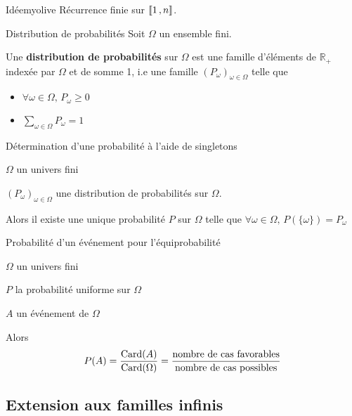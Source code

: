     \begin{demo}{Idée}{myolive}
        Récurrence finie sur $\left\llbracket 1 \, , n \right\rrbracket$.
    \end{demo}

    \begin{defi}{Distribution de probabilités}{}
        Soit $\Omega$ un ensemble fini.

        Une \textbf{distribution de probabilités} sur $\Omega$ est une famille d’éléments de $\mathbb{R}_+$ indexée par $\Omega$ et de somme 1, i.e une famille $(P_{\omega})_{\omega \in \Omega}$ telle que 
        \begin{itemize}
            \item $\forall \omega \in \Omega, \, P_{\omega} \geq 0$
            \item $\sum\limits_{\omega \in \Omega} P_{\omega} = 1$
        \end{itemize}
    \end{defi}

    \begin{theo}{Détermination d’une probabilité à l’aide de singletons}{}
        \begin{soient}
            \item $\Omega$ un univers fini
            \item $(P_{\omega})_{\omega \in \Omega}$ une distribution de probabilités sur $\Omega$.
        \end{soient}
    
        Alors il existe une unique probabilité $P$ sur $\Omega$ telle que $\forall \omega \in \Omega, \, P(\{\omega\}) = P_{\omega}$
    \end{theo}

    \begin{theo}{Probabilité d’un événement pour l’équiprobabilité}{}
        \begin{soient}
            \item $\Omega$ un univers fini
            \item $P$ la probabilité uniforme sur $\Omega$
            \item $A$ un événement de $\Omega$
        \end{soient}
        Alors 
        \[ P(A) = \frac{\operatorname{Card}(A)}{\operatorname{Card}(\Omega)} = \frac{\text{nombre de cas favorables}}{\text{nombre de cas possibles}} \]
    \end{theo}

\subsection{Extension aux familles infinis}

